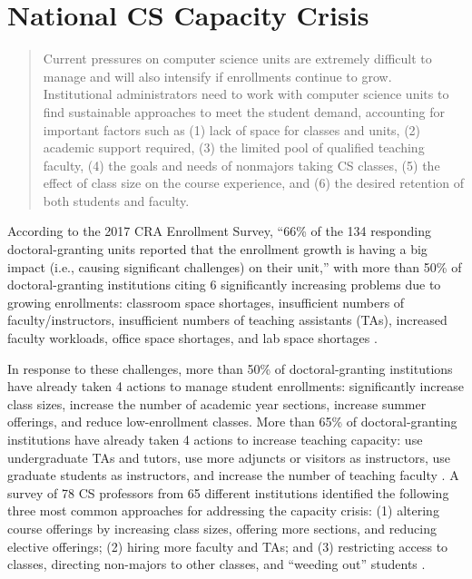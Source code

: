 \section{National CS Capacity Crisis}

\begin{quote}
    Current pressures on computer science units are extremely difficult to manage and will also intensify if enrollments continue to grow. Institutional administrators need to work with computer science units to find sustainable approaches to meet the student demand, accounting for important factors such as (1) lack of space for classes and units, (2) academic support required, (3) the limited pool of qualified teaching faculty, (4) the goals and needs of nonmajors taking CS classes, (5) the effect of class size on the course experience, and (6) the desired retention of both students and faculty. \cite{GenerationCS}
\end{quote}
According to the 2017 CRA Enrollment Survey, ``66\% of the 134 responding doctoral-granting units reported that the enrollment growth is having a big impact (i.e., causing significant challenges) on their unit,'' with more than 50\% of doctoral-granting institutions citing 6 significantly increasing problems due to growing enrollments: classroom space shortages, insufficient numbers of faculty/instructors, insufficient numbers of teaching assistants (TAs), increased faculty workloads, office space shortages, and lab space shortages \cite{GenerationCS}.

In response to these challenges, more than 50\% of doctoral-granting institutions have already taken 4 actions to manage student enrollments: significantly increase class sizes, increase the number of academic year sections, increase summer offerings, and reduce low-enrollment classes. More than 65\% of doctoral-granting institutions have already taken 4 actions to increase teaching capacity: use undergraduate TAs and tutors, use more adjuncts or visitors as instructors, use graduate students as instructors, and increase the number of teaching faculty \cite{GenerationCS}. A survey of 78 CS professors from 65 different institutions identified the following three most common approaches for addressing the capacity crisis: (1) altering course offerings by increasing class sizes, offering more sections, and reducing elective offerings; (2) hiring more faculty and TAs; and (3) restricting access to classes, directing non-majors to other classes, and ``weeding out'' students \cite{Patitsas:2016}.

